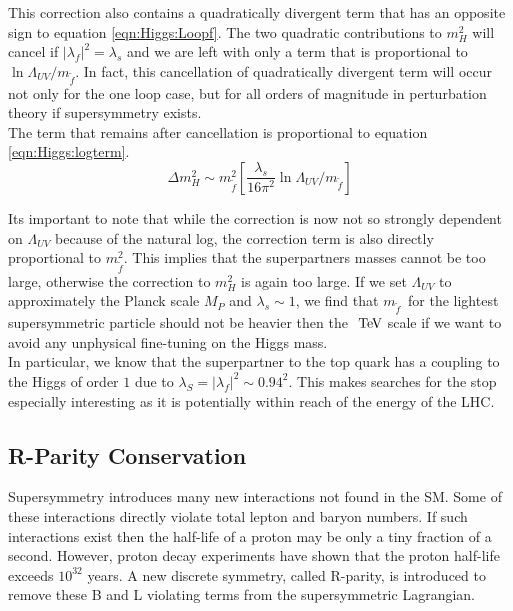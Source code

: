 \indent This correction also contains a quadratically divergent term that has an opposite sign to equation \ref{eqn:Higgs:Loopf}.  The two quadratic contributions to $m_H^2$ will cancel if $|\lambda_f|^2 = \lambda_s$ and we are left with only a term that is proportional to $\ln{\Lambda_{UV}/m_{\tilde{f}}}$. In fact, this cancellation of quadratically divergent term will occur not only for the one loop case, but for all orders of magnitude in perturbation theory if supersymmetry exists. \\

\indent The term that remains after cancellation is proportional to equation \ref{eqn:Higgs:logterm}. \\

\begin{equation}
\label{eqn:Higgs:LoopS}
\Delta m_H^2 \sim m_{\tilde{f}}^2[\frac{\lambda_s}{16\pi^2}\ln{\Lambda_{UV}/m_{\tilde{f}}}]
\end{equation}

\indent Its important to note that while the correction is now not so strongly dependent on $\Lambda_{UV}$ because of the natural log, the correction term is also directly proportional to $m_{\tilde{f}}^2$.  This implies that the superpartners masses cannot be too large, otherwise the correction to $m_H^2$ is again too large.  If we set $\Lambda_{UV}$ to approximately the Planck scale $M_P$ and $\lambda_s \sim 1$, we find that $m_{\tilde{f}}$~for the lightest supersymmetric particle should not be heavier then the $\tev$ scale if we want to avoid any unphysical fine-tuning on the Higgs mass.\cite{MartinSUSY}  \\

\indent In particular, we know that the superpartner to the top quark has a coupling to the Higgs of order $1$ due to $\lambda_S = |\lambda_f|^2 \sim 0.94^2$. This makes searches for the stop especially interesting as it is potentially within reach of the energy of the LHC. \\

\subsection{R-Parity Conservation}

\indent Supersymmetry introduces many new interactions not found in the SM.  Some of these interactions directly violate total lepton and baryon numbers.  If such interactions exist then the half-life of a proton may be only a tiny fraction of a second.  However, proton decay experiments have shown that the proton half-life exceeds $10^{32}$ years.  A new discrete symmetry, called R-parity, is introduced to remove these B and L violating terms from the supersymmetric Lagrangian.  \\

